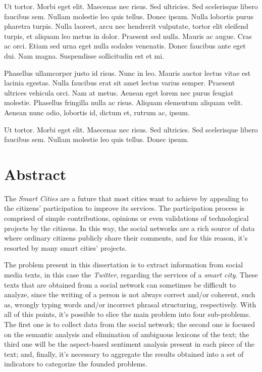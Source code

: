 Ut tortor. Morbi eget elit. Maecenas nec risus. Sed ultricies. Sed
scelerisque libero faucibus sem. Nullam molestie leo quis
tellus. Donec ipsum. Nulla lobortis purus pharetra turpis. Nulla
laoreet, arcu nec hendrerit vulputate, tortor elit eleifend turpis, et
aliquam leo metus in dolor. Praesent sed nulla. Mauris ac augue. Cras
ac orci. Etiam sed urna eget nulla sodales venenatis. Donec faucibus
ante eget dui. Nam magna. Suspendisse sollicitudin est et mi. 

Phasellus ullamcorper justo id risus. Nunc in leo. Mauris auctor
lectus vitae est lacinia egestas. Nulla faucibus erat sit amet lectus
varius semper. Praesent ultrices vehicula orci. Nam at metus. Aenean
eget lorem nec purus feugiat molestie. Phasellus fringilla nulla ac
risus. Aliquam elementum aliquam velit. Aenean nunc odio, lobortis id,
dictum et, rutrum ac, ipsum. 

Ut tortor. Morbi eget elit. Maecenas nec risus. Sed ultricies. Sed
scelerisque libero faucibus sem. Nullam molestie leo quis
tellus. Donec ipsum. 

\chapter*{Abstract}

The \textit{Smart Cities} are a future that most cities want to achieve by appealing to the citizens' participation to improve its services. The participation process is comprised of simple contributions, opinions or even validations of technological projects by the citizens. In this way, the social networks are a rich source of data where ordinary citizens publicly share their comments, and for this reason, it's resorted by many smart cities' projects.

The problem present in this dissertation is to extract information from social media texts, in this case the \textit{Twitter}, regarding the services of a \textit{smart city}. These texts that are  obtained from a social network can sometimes be difficult to analyze, since the writing of a person is not always correct and/or coherent, such as, wrongly typing words and/or incorrect phrasal structuring, respectively. With all of this points, it's possible to slice the main problem into four sub-problems. The first one is to collect data from the social network; the second one is focused on the semantic analysis and elimination of ambiguous lexicons of the text; the third one will be the aspect-based sentiment analysis present in each piece of the text; and, finally, it's necessary to aggregate the results obtained into a set of indicators to categorize the founded problems.


